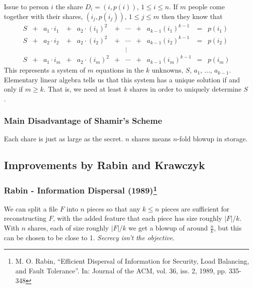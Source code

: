 \documentclass[11pt]{article}
\begin{document}
\noindent Issue to person $i$ the share $D_i = (i, p(i))$, $1\leq i\leq n$. If $m$ people come together with their shares, $(i_j, p(i_j))$, $1\leq j\leq m$ then they know that
\[
\begin{array}{ccccccccccc}
	S & + & a_1\cdot i_1 & + & a_2\cdot (i_1)^2 &+& \cdots& + & a_{k-1}(i_1)^{k-1} & = & p(i_1)\\
	S & + & a_2\cdot i_2 & + & a_2\cdot (i_2)^2 &+& \cdots& + & a_{k-1}(i_2)^{k-1} & = & p(i_2)\\
	&&&&&&\vdots&&&\\
	S & + & a_1\cdot i_m & + & a_2\cdot (i_m)^2 &+& \cdots& + & a_{k-1}(i_m)^{k-1} & = & p(i_m)
\end{array}
\]
This represents a system of $m$ equations in the $k$ unknowns, $S$, $a_1$, $\ldots$, $a_{k-1}$. Elementary linear algebra tells us that this system has a unique solution if and only if $m\geq k$. That is, we need at least $k$ shares in order to uniquely determine $S$.

\subsubsection*{Main Disadvantage of Shamir's Scheme}
Each share is just as large as the secret. $n$ shares means $n$-fold blowup in storage.

\subsection*{Improvements by Rabin and Krawczyk}
\subsubsection*{Rabin - Information Dispersal (1989)\footnote{M. O. Rabin, ``Efficient Dispersal of Information for Security, Load Balancing, and Fault Tolerance''. In: Journal of the ACM, vol. 36, iss. 2, 1989, pp. 335-348}}
We can split a file $F$ into $n$ pieces so that any $k\leq n$ pieces are sufficient for reconstructing $F$, with the added feature that each piece has size roughly $|F|/k$. With $n$ shares, each of size roughly $|F|/k$ we get a blowup of around $\frac{n}{k}$, but this can be chosen to be close to 1. \textit{Secrecy isn't the objective.}\\
\end{document}
